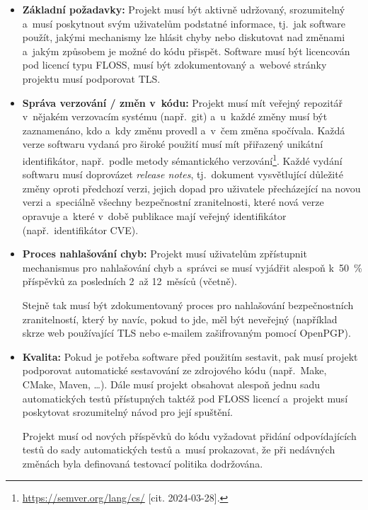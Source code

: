 \begin{itemize}
    \item \textbf{Základní požadavky:} \enskip
        Projekt musí být aktivně udržovaný, srozumitelný a~musí poskytnout svým uživatelům podstatné informace, tj.\ jak software použít, jakými mechanismy lze hlásit chyby nebo diskutovat nad změnami a~jakým způsobem je možné do kódu přispět. Software musí být licencován pod licencí typu FLOSS, musí být zdokumentovaný a~webové stránky projektu musí podporovat TLS.

    \item \textbf{Správa verzování / změn v~kódu:} \enskip
        Projekt musí mít veřejný repozitář v~nějakém verzovacím systému (např.\ git) a~u~každé změny musí být zaznamenáno, kdo a~kdy změnu provedl a~v~čem změna spočívala. Každá verze softwaru vydaná pro široké použití musí mít přiřazený unikátní identifikátor, např.\ podle metody sémantického verzování\footnote{\url{https://semver.org/lang/cs/} [cit. 2024-03-28].}. Každé vydání softwaru musí doprovázet \emph{release notes}, tj.\ dokument vysvětlující důležité změny oproti předchozí verzi, jejich dopad pro uživatele přecházející na novou verzi a~speciálně všechny bezpečnostní zranitelnosti, které nová verze opravuje a~které v~době publikace mají veřejný identifikátor (např.\ identifikátor CVE).

    \item \textbf{Proces nahlašování chyb:} \enskip
        Projekt musí uživatelům zpřístupnit mechanismus pro na\-hla\-šo\-vá\-ní chyb a~správci se musí vyjádřit alespoň k~50~\% příspěvků za posledních 2~až 12~měsíců (včetně).

        Stejně tak musí být zdokumentovaný proces pro nahlašování bezpečnostních zranitelností, který by navíc, pokud to jde, měl být neveřejný (například skrze web používající TLS nebo e-mailem zašifrovaným pomocí OpenPGP).

    \item \textbf{Kvalita:} \enskip
        Pokud je potřeba software před použitím sestavit, pak musí projekt podporovat automatické sestavování ze zdrojového kódu (např.\ Make, CMake, Maven, \dots). Dále musí projekt obsahovat alespoň jednu sadu automatických testů přístupných taktéž pod FLOSS licencí a~projekt musí poskytovat srozumitelný návod pro její spuštění.

        Projekt musí od nových příspěvků do kódu vyžadovat přidání odpovídajících testů do sady automatických testů a~musí prokazovat, že při nedávných změnách byla definovaná testovací politika dodržována.


\end{itemize}
